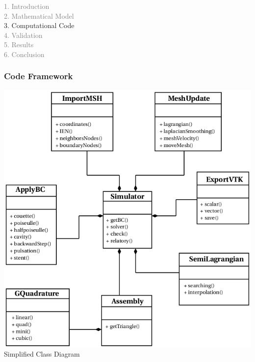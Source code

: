 


\begin{frame}
  \vspace{-1cm}
  \textcolor{gray}{1. Introduction}\\[0.1cm]
  \textcolor{gray}{2. Mathematical Model}\\[0.1cm]
  3. Computational Code\\[0.1cm]
  \textcolor{gray}{4. Validation}\\[0.1cm]
  \textcolor{gray}{5. Results}\\[0.1cm]
  \textcolor{gray}{6. Conclusion}
\end{frame}





\begin{frame}
 \frametitle{\LARGE Code Framework}
\vspace{-0.5cm}
\begin{center}
  \includegraphics[scale=0.3]{images/uml.png}\\[0.3cm]
  \caption{Simplified Class Diagram}
\end{center}
\end{frame}



